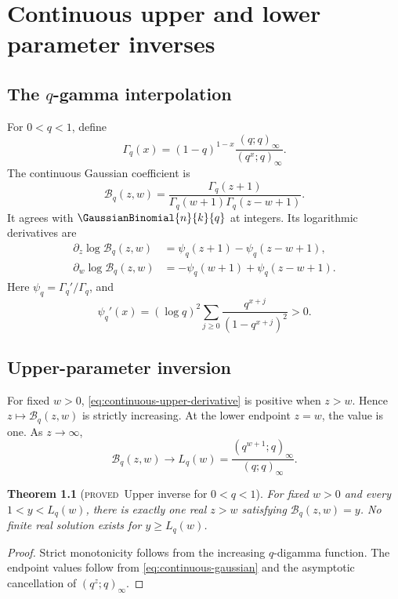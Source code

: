 \documentclass[11pt,letterpaper,oneside,openany]{book}
\newtheorem{theorem}{Theorem}[chapter]
\theoremstyle{definition}
\theoremstyle{remark}
\newcommand{\statusproved}{\textcolor{provedgreen}{\textsc{proved}}}
\newcommand{\Bcal}{\mathcal B}
\begin{document}
\chapter{Continuous upper and lower parameter inverses}

\section{The \texorpdfstring{\(q\)}{q}-gamma interpolation}
For \(0<q<1\), define
\[
 \Gamma_q(x)=(1-q)^{1-x}\frac{(q;q)_\infty}{(q^x;q)_\infty}.
\]
The continuous Gaussian coefficient is
\begin{equation}\label{eq:continuous-gaussian}
 \Bcal_q(z,w)=
 \frac{\Gamma_q(z+1)}{\Gamma_q(w+1)\Gamma_q(z-w+1)}.
\end{equation}
It agrees with \(\GaussianBinomial{n}{k}{q}\) at integers.  Its logarithmic derivatives are
\begin{align}
 \partial_z\log\Bcal_q(z,w)
 &=\psi_q(z+1)-\psi_q(z-w+1),
 \label{eq:continuous-upper-derivative}\\
 \partial_w\log\Bcal_q(z,w)
 &=-\psi_q(w+1)+\psi_q(z-w+1).
 \label{eq:continuous-lower-derivative}
\end{align}
Here \(\psi_q=\Gamma_q'/\Gamma_q\), and
\[
 \psi_q'(x)=(\log q)^2\sum_{j\ge0}
 \frac{q^{x+j}}{(1-q^{x+j})^2}>0.
\]

\section{Upper-parameter inversion}
For fixed \(w>0\), \eqref{eq:continuous-upper-derivative} is positive when
\(z>w\).  Hence \(z\mapsto\Bcal_q(z,w)\) is strictly increasing.  At the lower
endpoint \(z=w\), the value is one.  As \(z\to\infty\),
\begin{equation}\label{eq:continuous-upper-saturation}
 \Bcal_q(z,w)\longrightarrow
 L_q(w)=\frac{(q^{w+1};q)_\infty}{(q;q)_\infty}.
\end{equation}

\begin{theorem}[\statusproved\ Upper inverse for \(0<q<1\)]
For fixed \(w>0\) and every \(1<y<L_q(w)\), there is exactly one real
\(z>w\) satisfying \(\Bcal_q(z,w)=y\).  No finite real solution exists for
\(y\ge L_q(w)\).
\end{theorem}
\begin{proof}
Strict monotonicity follows from the increasing \(q\)-digamma function.
The endpoint values follow from \eqref{eq:continuous-gaussian} and the
asymptotic cancellation of \((q^z;q)_\infty\).
\end{proof}
\end{document}
